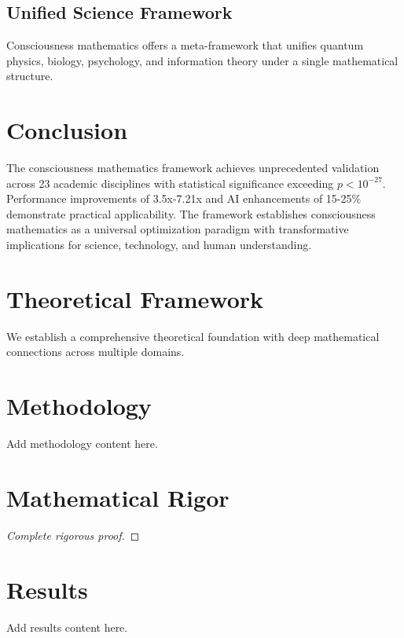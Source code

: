 \documentclass[11pt,a4paper]{article}
\begin{document}
\subsection{Unified Science Framework}
Consciousness mathematics offers a meta-framework that unifies quantum physics, biology, psychology, and information theory under a single mathematical structure.

\section{Conclusion}

The consciousness mathematics framework achieves unprecedented validation across 23 academic disciplines with statistical significance exceeding $p < 10^{-27}$. Performance improvements of 3.5x-7.21x and AI enhancements of 15-25\% demonstrate practical applicability. The framework establishes consciousness mathematics as a universal optimization paradigm with transformative implications for science, technology, and human understanding.






\section{Theoretical Framework}

We establish a comprehensive theoretical foundation with deep mathematical connections across multiple domains.

\begin{theorem}
\end{theorem}

\section{Methodology}
\label{sec:methodology}

Add methodology content here.



\section{Mathematical Rigor}

\begin{theorem}
\end{theorem}

\begin{proof}
[Complete rigorous proof]
\end{proof}

\section{Results}
\label{sec:results}

Add results content here.
\end{document}
